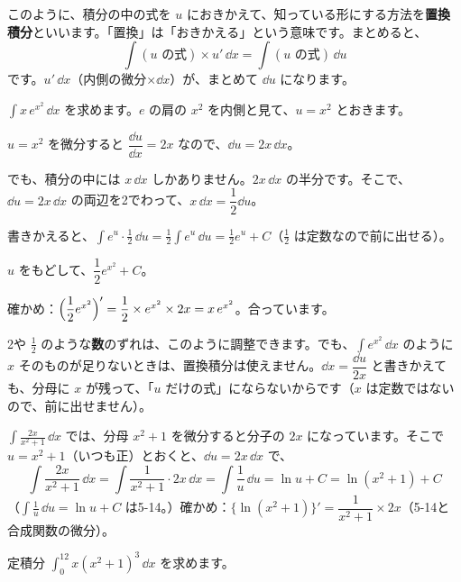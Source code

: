 このように、積分の中の式を $u$ におきかえて、知っている形にする方法を\textbf{置換積分}といいます。「置換」は「おきかえる」という意味です。まとめると、
\[ \int(\text{$u$ の式})\times u'\,\dd x=\int(\text{$u$ の式})\,\dd u \]
です。$u'\,\dd x$（内側の微分×$\dd x$）が、まとめて $\dd u$ になります。


\label{bk:5-16:keisu}$\displaystyle\int x\,e^{x^2}\,\dd x$ を求めます。$e$ の肩の $x^2$ を内側と見て、$u=x^2$ とおきます。
\begin{enumerate}[label={\bkcircled[bkTheme]{\arabic*}}, leftmargin=2.4\zw, itemsep=1pt, topsep=2pt]
\item $u=x^2$ を微分すると $\dfrac{\dd u}{\dd x}=2x$ なので、$\dd u=2x\,\dd x$。
\item でも、積分の中には $x\,\dd x$ しかありません。$2x\,\dd x$ の半分です。そこで、$\dd u=2x\,\dd x$ の両辺を2でわって、$x\,\dd x=\dfrac{1}{2}\dd u$。
\item 書きかえると、$\displaystyle\int e^{u}\cdot\frac{1}{2}\,\dd u=\frac{1}{2}\int e^u\,\dd u=\frac{1}{2}e^u+C$（$\frac{1}{2}$ は定数なので前に出せる）。
\item $u$ をもどして、$\dfrac{1}{2}e^{x^2}+C$。
\end{enumerate}
確かめ：$\Bigl(\dfrac{1}{2}e^{x^2}\Bigr)'=\dfrac{1}{2}\times e^{x^2}\times2x=x\,e^{x^2}$。合っています。

2や $\frac{1}{2}$ のような\textbf{数}のずれは、このように調整できます。でも、$\displaystyle\int e^{x^2}\,\dd x$ のように $x$ そのものが足りないときは、置換積分は使えません。$\dd x=\dfrac{\dd u}{2x}$ と書きかえても、分母に $x$ が残って、「$u$ だけの式」にならないからです（$x$ は定数ではないので、前に出せません）。

$\displaystyle\int\frac{2x}{x^2+1}\,\dd x$ では、分母 $x^2+1$ を微分すると分子の $2x$ になっています。そこで $u=x^2+1$（いつも正）とおくと、$\dd u=2x\,\dd x$ で、
\[ \int\frac{2x}{x^2+1}\,\dd x=\int\frac{1}{x^2+1}\cdot2x\,\dd x=\int\frac{1}{u}\,\dd u=\ln u+C=\ln(x^2+1)+C \]
（$\displaystyle\int\frac{1}{u}\,\dd u=\ln u+C$ は5-14。）確かめ：$\{\ln(x^2+1)\}'=\dfrac{1}{x^2+1}\times2x$（5-14と合成関数の微分）。


\label{bk:5-16:hanni}定積分 $\displaystyle\int_0^12x(x^2+1)^3\,\dd x$ を求めます。

